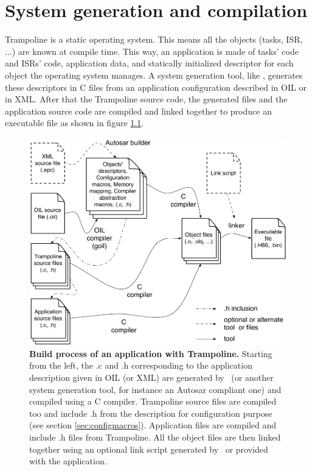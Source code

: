 
\chapter{System generation and compilation}

Trampoline is a static operating system. This means all the objects (tasks, ISR, ...) are known at compile time. This way, an application is made of tasks' code and ISRs' code, application data, and statically initialized descriptor for each object the operating system manages. A system generation tool, like \goil, generates these descriptors in C files from an application configuration described in OIL or in XML. After that the Trampoline source code, the generated files and the application source code are compiled and linked together to produce an executable file as shown in figure \ref{fig:buildtrampoline}.

\begin{figure}[htbp] %
   \centering
   \includegraphics[width=4.5in]{pictures/buildProcess.pdf} 
   \caption{\textbf{Build process of an application with Trampoline.} Starting from the left, the .c and .h corresponding to the application description given in OIL (or XML) are generated by \goil\ (or another system generation tool, for instance an Autosar compliant one) and compiled using a C compiler. Trampoline source files are compiled too and include .h from the description for configuration purpose (see section \ref{sec:configmacros}). Application files are compiled and include .h files from Trampoline. All the object files are then linked together using an optional link script generated by \goil\ or provided with the application.}\label{fig:buildtrampoline}
\end{figure}

